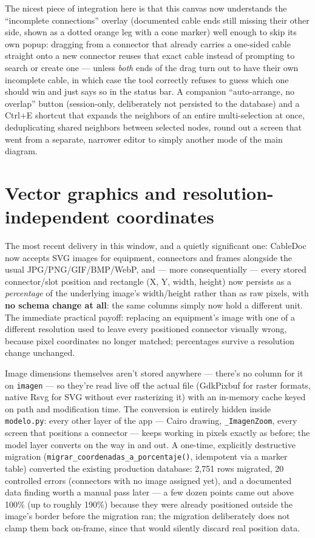 \documentclass[10.4pt,twocolumn]{article}
\begin{document}
The nicest piece of integration here is that this canvas now understands the ``incomplete connections'' overlay (documented cable ends still missing their other side, shown as a dotted orange leg with a cone marker) well enough to skip its own popup: dragging from a connector that already carries a one-sided cable straight onto a new connector reuses that exact cable instead of prompting to search or create one --- unless \emph{both} ends of the drag turn out to have their own incomplete cable, in which case the tool correctly refuses to guess which one should win and just says so in the status bar. A companion ``auto-arrange, no overlap'' button (session-only, deliberately not persisted to the database) and a Ctrl+E shortcut that expands the neighbors of an entire multi-selection at once, deduplicating shared neighbors between selected nodes, round out a screen that went from a separate, narrower editor to simply another mode of the main diagram.

\section{Vector graphics and resolution-independent coordinates}

The most recent delivery in this window, and a quietly significant one: CableDoc now accepts SVG images for equipment, connectors and frames alongside the usual JPG/PNG/GIF/BMP/WebP, and --- more consequentially --- every stored connector/slot position and rectangle (X, Y, width, height) now persists as a \emph{percentage} of the underlying image's width/height rather than as raw pixels, with \textbf{no schema change at all}: the same columns simply now hold a different unit. The immediate practical payoff: replacing an equipment's image with one of a different resolution used to leave every positioned connector visually wrong, because pixel coordinates no longer matched; percentages survive a resolution change unchanged.

Image dimensions themselves aren't stored anywhere --- there's no column for it on \texttt{imagen} --- so they're read live off the actual file (GdkPixbuf for raster formats, native Rsvg for SVG without ever rasterizing it) with an in-memory cache keyed on path and modification time. The conversion is entirely hidden inside \texttt{modelo.py}: every other layer of the app --- Cairo drawing, \texttt{\_ImagenZoom}, every screen that positions a connector --- keeps working in pixels exactly as before; the model layer converts on the way in and out. A one-time, explicitly destructive migration (\texttt{migrar\_coordenadas\_a\_porcentaje()}, idempotent via a marker table) converted the existing production database: 2{,}751 rows migrated, 20 controlled errors (connectors with no image assigned yet), and a documented data finding worth a manual pass later --- a few dozen points came out above 100\% (up to roughly 190\%) because they were already positioned outside the image's border before the migration ran; the migration deliberately does not clamp them back on-frame, since that would silently discard real position data.
\end{document}
